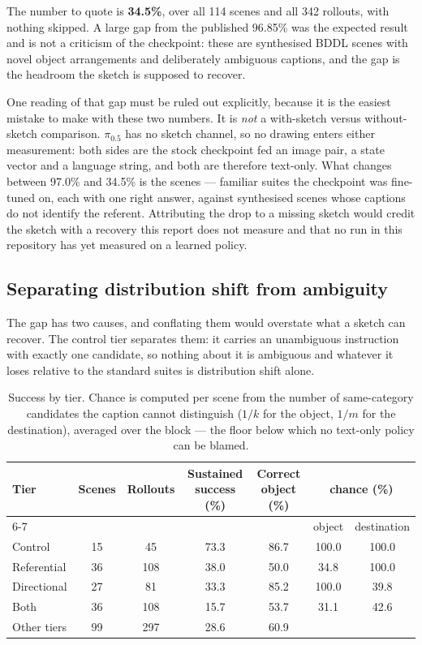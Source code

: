 \documentclass[11pt,a4paper]{article}
\begin{document}
\noindent
The number to quote is \textbf{34.5\%}, over all 114 scenes and all 342
rollouts, with nothing skipped. A large gap from the published 96.85\% was the
expected result and is not a criticism of the checkpoint: these are synthesised
BDDL scenes with novel object arrangements and deliberately ambiguous captions,
and the gap is the headroom the sketch is supposed to recover.

\noindent
One reading of that gap must be ruled out explicitly, because it is the easiest
mistake to make with these two numbers. It is \emph{not} a with-sketch versus
without-sketch comparison. $\pi_{0.5}$ has no sketch channel, so no drawing enters
either measurement: both sides are the stock checkpoint fed an image pair, a
state vector and a language string, and both are therefore text-only. What
changes between 97.0\% and 34.5\% is the scenes --- familiar suites the checkpoint
was fine-tuned on, each with one right answer, against synthesised scenes whose
captions do not identify the referent. Attributing the drop to a missing sketch
would credit the sketch with a recovery this report does not measure and that no
run in this repository has yet measured on a learned policy.

\subsection{Separating distribution shift from ambiguity}

The gap has two causes, and conflating them would overstate what a sketch can
recover. The control tier separates them: it carries an unambiguous instruction
with exactly one candidate, so nothing about it is ambiguous and whatever it
loses relative to the standard suites is distribution shift alone.

\begin{table}[h]
\centering
\caption{Success by tier. Chance is computed per scene from the number of
same-category candidates the caption cannot distinguish ($1/k$ for the object,
$1/m$ for the destination), averaged over the block --- the floor below which no
text-only policy can be blamed.}
\begin{tabular}{lcccccc}
\toprule
Tier & Scenes & Rollouts & Sustained success (\%) & Correct object (\%) & \multicolumn{2}{c}{chance (\%)} \\
\cmidrule(lr){6-7}
 & & & & & object & destination \\
\midrule
Control       & 15 & 45  & 73.3 & 86.7 & 100.0 & 100.0 \\
Referential   & 36 & 108 & 38.0 & 50.0 & 34.8  & 100.0 \\
Directional   & 27 & 81  & 33.3 & 85.2 & 100.0 & 39.8 \\
Both          & 36 & 108 & 15.7 & 53.7 & 31.1  & 42.6 \\
\midrule
Other tiers   & 99 & 297 & 28.6 & 60.9 & & \\
\bottomrule
\end{tabular}
\end{table}
\end{document}
